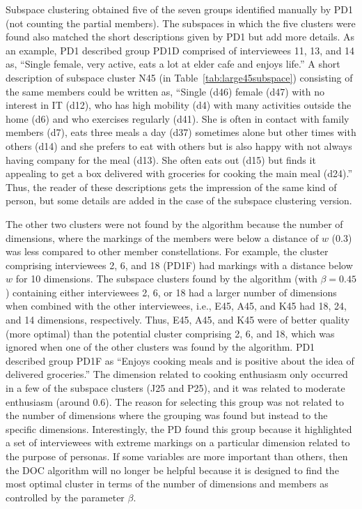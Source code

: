 Subspace clustering obtained five of the seven groups identified manually by PD1 (not counting the partial members). The subspaces in which the five clusters were found also matched the short descriptions given by PD1 but add more details. As an example, PD1 described group PD1D comprised of interviewees 11, 13, and 14 as, ``Single female, very active, eats a lot at elder cafe and enjoys life.'' A short description of subspace cluster N45 (in Table~\ref{tab:large45subspace}) consisting of the same members could be written as, ``Single (d46) female (d47) with no interest in IT (d12), who has high mobility (d4) with many activities outside the home (d6) and who exercises regularly (d41). She is often in contact with family members (d7), eats three meals a day (d37) sometimes alone but other times with others (d14) and she prefers to eat with others but is also happy with not always having company for the meal (d13). She often eats out (d15) but finds it appealing to get a box delivered with groceries for cooking the main meal (d24).'' Thus, the reader of these descriptions gets the impression of the same kind of person, but some details are added in the case of the subspace clustering version.

The other two clusters were not found by the algorithm because the number of dimensions, where the markings of the members were below a distance of $w$ (0.3) was less compared to other member constellations. For example, the cluster comprising interviewees 2, 6, and 18 (PD1F) had markings with a distance below $w$ for 10 dimensions. The subspace clusters found by the algorithm (with $\beta=0.45$) containing either interviewees 2, 6, or 18 had a larger number of dimensions when combined with the other interviewees, i.e., E45, A45, and K45 had 18, 24, and 14 dimensions, respectively. Thus, E45, A45, and K45 were of better quality (more optimal) than the potential cluster comprising 2, 6, and 18, which was ignored when one of the other clusters was found by the algorithm. PD1 described group PD1F as ``Enjoys cooking meals and is positive about the idea of delivered groceries.'' The dimension related to cooking enthusiasm only occurred in a few of the subspace clusters (J25 and P25), and it was related to moderate enthusiasm (around 0.6). The reason for selecting this group was not related to the number of dimensions where the grouping was found but instead to the specific dimensions. Interestingly, the PD found this group because it highlighted a set of interviewees with extreme markings on a particular dimension related to the purpose of personas. If some variables are more important than others, then the DOC algorithm will no longer be helpful because it is designed to find the most optimal cluster in terms of the number of dimensions and members as controlled by the parameter $\beta$.

